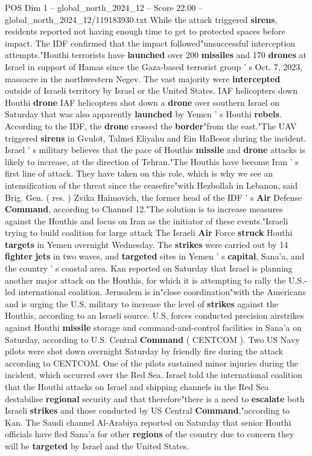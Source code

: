 \begin{textsample}{POS Dim 1 – global\_north\_2024\_12 – Score 22.00 – global\_north\_2024\_12/119183930.txt}
While the attack triggered \textbf{sirens}, residents reported not having enough time to get to protected spaces before impact.
The IDF confirmed that the impact followed"unsuccessful interception attempts."Houthi terrorists have \textbf{launched} over 200 \textbf{missiles} and 170 \textbf{drones} at Israel in support of Hamas since the Gaza-based terrorist group ' s Oct. 7, 2023, massacre in the northwestern Negev.
The vast majority were \textbf{intercepted} outside of Israeli territory by Israel or the United States.
IAF helicopters down Houthi \textbf{drone} IAF helicopters shot down a \textbf{drone} over southern Israel on Saturday that was also apparently \textbf{launched} by Yemen ' s Houthi \textbf{rebels}.
According to the IDF, the \textbf{drone} crossed the \textbf{border}"from the east."The UAV triggered \textbf{sirens} in Gvulot, Talmei Eliyahu and Ein HaBesor during the incident.
Israel ' s military believes that the pace of Houthis \textbf{missile} and \textbf{drone} attacks is likely to increase, at the direction of Tehran."The Houthis have become Iran ' s first line of attack.
They have taken on this role, which is why we see an intensification of the threat since the ceasefire"with Hezbollah in Lebanon, said Brig.
Gen. ( res. ) Zvika Haimovich, the former head of the IDF ' s \textbf{Air} Defense \textbf{Command}, according to Channel 12."The solution is to increase measures against the Houthis and focus on Iran as the initiator of these events."Israeli trying to build coalition for large attack The Israeli \textbf{Air} Force \textbf{struck} Houthi \textbf{targets} in Yemen overnight Wednesday.
The \textbf{strikes} were carried out by 14 \textbf{fighter} \textbf{jets} in two waves, and \textbf{targeted} sites in Yemen ' s \textbf{capital}, Sana'a, and the country ' s coastal area.
Kan reported on Saturday that Israel is planning another major attack on the Houthis, for which it is attempting to rally the U.S.-led international coalition.
Jerusalem is in"close coordination"with the Americans and is urging the U.S. military to increase the level of \textbf{strikes} against the Houthis, according to an Israeli source.
U.S. forces conducted precision airstrikes against Houthi \textbf{missile} storage and command-and-control facilities in Sana'a on Saturday, according to U.S.
Central \textbf{Command} ( CENTCOM ).
Two US Navy pilots were shot down overnight Saturday by friendly fire during the attack according to CENTCOM.
One of the pilots sustained minor injuries during the incident, which occurred over the Red Sea.
Israel told the international coalition that the Houthi attacks on Israel and shipping channels in the Red Sea destabilise \textbf{regional} security and that therefore"there is a need to \textbf{escalate} both Israeli \textbf{strikes} and those conducted by US Central \textbf{Command},"according to Kan.
The Saudi channel Al-Arabiya reported on Saturday that senior Houthi officials have fled Sana'a for other \textbf{regions} of the country due to concern they will be \textbf{targeted} by Israel and the United States.


\end{textsample}
